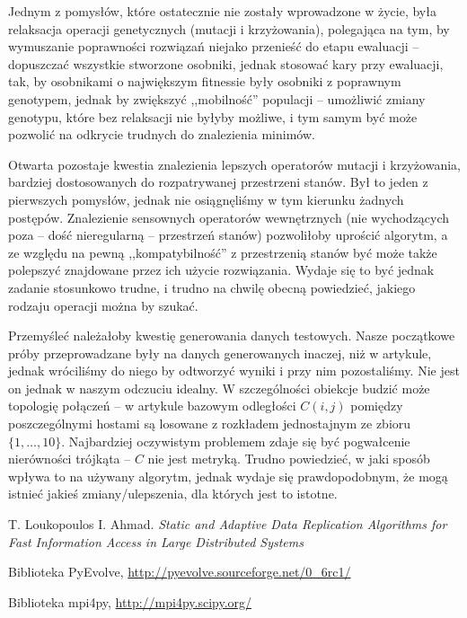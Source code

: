 \documentclass[11pt,pdftex,a4paper]{scrartcl}
\begin{document}
Jednym z pomysłów, które ostatecznie nie zostały wprowadzone w życie, była relaksacja operacji
genetycznych (mutacji i krzyżowania), polegająca na tym, by wymuszanie poprawności rozwiązań niejako
przenieść do etapu ewaluacji -- dopuszczać wszystkie stworzone osobniki, jednak stosować kary przy
ewaluacji, tak, by osobnikami o największym fitnessie były osobniki z poprawnym genotypem, jednak by
zwiększyć ,,mobilność'' populacji -- umożliwić zmiany genotypu, które bez relaksacji nie byłyby 
możliwe, i tym samym być może pozwolić na odkrycie trudnych do znalezienia minimów.

Otwarta pozostaje kwestia znalezienia lepszych operatorów mutacji i krzyżowania, bardziej dostosowanych
do rozpatrywanej przestrzeni stanów. Był to jeden z pierwszych pomysłów, jednak nie osiągnęliśmy w tym
kierunku żadnych postępów. Znalezienie sensownych operatorów wewnętrznych (nie wychodzących poza --
dość nieregularną -- przestrzeń stanów) pozwoliłoby uprościć algorytm, a ze względu na pewną 
,,kompatybilność'' z przestrzenią stanów być może także polepszyć znajdowane przez ich użycie 
rozwiązania. Wydaje się to być jednak zadanie stosunkowo trudne, i trudno na chwilę obecną powiedzieć,
jakiego rodzaju operacji można by szukać.

Przemyśleć należałoby kwestię generowania danych testowych. Nasze początkowe próby przeprowadzane
były na danych generowanych inaczej, niż w artykule, jednak wróciliśmy do niego by odtworzyć wyniki
i przy nim pozostaliśmy. Nie jest on jednak w naszym odczuciu idealny. W szczególności obiekcje 
budzić może topologię połączeń -- w artykule bazowym odległości \(C(i,j)\) pomiędzy poszczególnymi
hostami są losowane z rozkładem jednostajnym ze zbioru \(\{1,\ldots,10\}\). Najbardziej oczywistym
problemem zdaje się być pogwałcenie nierówności trójkąta -- \(C\) nie jest metryką. Trudno powiedzieć,
w jaki sposób wpływa to na używany algorytm, jednak wydaje się prawdopodobnym, że mogą istnieć jakieś
zmiany/ulepszenia, dla których jest to istotne. 

\begin{thebibliography}{}

  T. Loukopoulos I. Ahmad.
  \emph{Static and Adaptive Data Replication Algorithms for Fast Information Access in 
    Large Distributed Systems}

  Biblioteka PyEvolve,
  \url{http://pyevolve.sourceforge.net/0_6rc1/}

  Biblioteka mpi4py,
  \url{http://mpi4py.scipy.org/}

\end{thebibliography}
\end{document}
